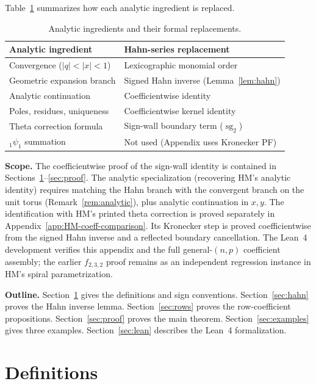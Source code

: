 \documentclass[11pt]{article}
\newcommand{\sgtwo}{\operatorname{sg}_2}
\begin{document}
Table~\ref{tab:replacement} summarizes how each analytic ingredient
is replaced.

\begin{table}[ht]
\centering
\begin{tabular}{ll}
\hline
\textbf{Analytic ingredient} & \textbf{Hahn-series replacement} \\
\hline
Convergence ($|q|<|x|<1$) & Lexicographic monomial order \\
Geometric expansion branch & Signed Hahn inverse (Lemma~\ref{lem:hahn}) \\
Analytic continuation & Coefficientwise identity \\
Poles, residues, uniqueness & Coefficientwise kernel identity \\
Theta correction formula & Sign-wall boundary term ($\sgtwo$) \\
${}_1\psi_1$ summation & Not used (Appendix uses Kronecker PF) \\
\hline
\end{tabular}
\caption{Analytic ingredients and their formal replacements.}
\label{tab:replacement}
\end{table}

\medskip
\noindent\textbf{Scope.}
The coefficientwise proof of the sign-wall identity is
contained in Sections~\ref{sec:defs}--\ref{sec:proof}.
The analytic specialization (recovering HM's analytic identity)
requires matching the Hahn branch with the convergent branch
on the unit torus (Remark~\ref{rem:analytic}), plus analytic
continuation in $x,y$.
The identification with HM's printed theta correction is proved
separately in Appendix~\ref{app:HM-coeff-comparison}.  Its Kronecker step is
proved coefficientwise from the signed Hahn inverse and a reflected boundary
cancellation.  The Lean~4 development verifies this appendix and the full
general-$(n,p)$ coefficient assembly; the earlier $f_{2,3,2}$ proof remains
as an independent regression instance in HM's spiral parametrization.

\medskip
\noindent\textbf{Outline.}
Section~\ref{sec:defs} gives the definitions and sign conventions.
Section~\ref{sec:hahn} proves the Hahn inverse lemma.
Section~\ref{sec:rows} proves the row-coefficient propositions.
Section~\ref{sec:proof} proves the main theorem.
Section~\ref{sec:examples} gives three examples.
Section~\ref{sec:lean} describes the Lean~4 formalization.

\section{Definitions}\label{sec:defs}
\end{document}

